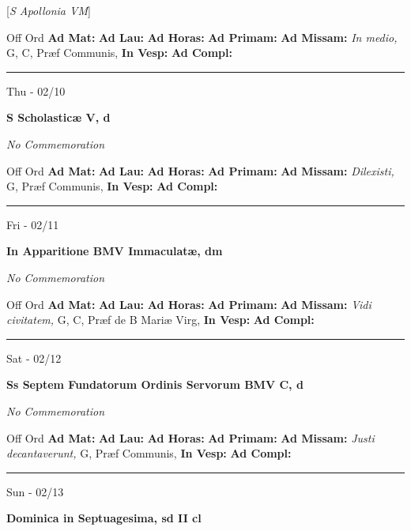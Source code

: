 \documentclass[letterpaper, 10pt]{article}
\begin{document}
[\textit{S Apollonia VM}]
\begin{justify}
Off Ord
\textbf{Ad Mat: }
\textbf{Ad Lau: }
\textbf{Ad Horas: }
\textbf{Ad Primam: }
\textbf{Ad Missam:} \textit{In medio, } G, C, Præf Communis, 
\textbf{In Vesp: }
\textbf{Ad Compl: }\end{justify}



\hrule
\begin{center}
Thu - 02/10
\end{center}\textbf{ \large S Scholasticæ V, \textnormal{\normalsize d}}

\textit{No Commemoration}\begin{justify}
Off Ord
\textbf{Ad Mat: }
\textbf{Ad Lau: }
\textbf{Ad Horas: }
\textbf{Ad Primam: }
\textbf{Ad Missam:} \textit{Dilexisti, } G, Præf Communis, 
\textbf{In Vesp: }
\textbf{Ad Compl: }\end{justify}



\hrule
\begin{center}
Fri - 02/11
\end{center}\textbf{ \large In Apparitione BMV Immaculatæ, \textnormal{\normalsize dm}}

\textit{No Commemoration}\begin{justify}
Off Ord
\textbf{Ad Mat: }
\textbf{Ad Lau: }
\textbf{Ad Horas: }
\textbf{Ad Primam: }
\textbf{Ad Missam:} \textit{Vidi civitatem, } G, C, Præf de B Mariæ Virg, 
\textbf{In Vesp: }
\textbf{Ad Compl: }\end{justify}



\hrule
\begin{center}
Sat - 02/12
\end{center}\textbf{ \large Ss Septem Fundatorum Ordinis Servorum BMV C, \textnormal{\normalsize d}}

\textit{No Commemoration}\begin{justify}
Off Ord
\textbf{Ad Mat: }
\textbf{Ad Lau: }
\textbf{Ad Horas: }
\textbf{Ad Primam: }
\textbf{Ad Missam:} \textit{Justi decantaverunt, } G, Præf Communis, 
\textbf{In Vesp: }
\textbf{Ad Compl: }\end{justify}



\hrule
\begin{center}
Sun - 02/13
\end{center}\textbf{ \large Dominica in Septuagesima, \textnormal{\normalsize sd II cl}}
\end{document}
